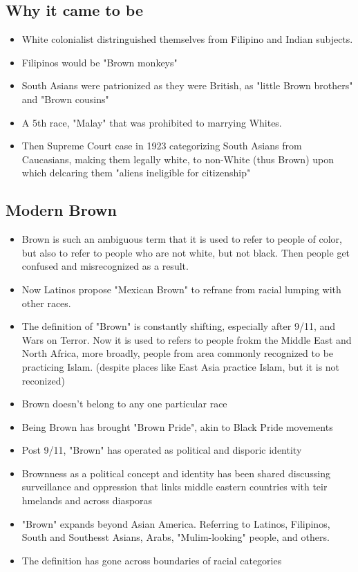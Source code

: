 \documentclass{article}
\begin{document}
  \subsection{Why it came to be}
  \begin{itemize}
    \item White colonialist distringuished themselves from Filipino and
      Indian subjects.
    \item Filipinos would be "Brown monkeys"
    \item South Asians were patrionized as they were British,
      as "little Brown brothers" and "Brown cousins"
    \item A 5th race, "Malay" that was prohibited to marrying Whites.
    \item Then Supreme Court case in 1923 categorizing South Asians from
      Caucasians, making them legally white, to non-White (thus Brown)
      upon which delcaring them "aliens ineligible for citizenship"
  \end{itemize}

  \subsection{Modern Brown}
  \begin{itemize}
    \item Brown is such an ambiguous term that it is used to refer to
      people of color, but also to refer to people who are not
      white, but not black. Then people get confused and misrecognized
      as a result.
    \item Now Latinos propose "Mexican Brown" to refrane from racial
      lumping with other races.
    \item The definition of "Brown" is constantly shifting, especially after
      9/11, and Wars on Terror. Now it is used to refers to people
      frokm the Middle East and North Africa, more broadly, people
      from area commonly recognized to be practicing Islam.
      (despite places like East Asia practice Islam, but it is not reconized)
    \item Brown doesn't belong to any one particular race
    \item Being Brown has brought "Brown Pride", akin to Black Pride movements
    \item Post 9/11, "Brown" has operated as political and disporic identity
    \item Brownness as a political concept and identity has been shared
      discussing surveillance and oppression that links middle eastern countries
      with teir hmelands and across diasporas
    \item "Brown" expands beyond Asian America. Referring to Latinos,
      Filipinos, South and Southesst Asians, Arabs, "Mulim-looking" people,
      and others.
    \item The definition has gone across boundaries of racial categories
  \end{itemize}
\end{document}
